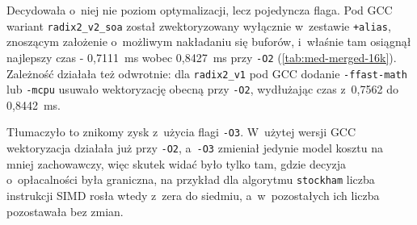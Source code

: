 Decydowała o~niej nie poziom optymalizacji, lecz pojedyncza flaga. Pod GCC wariant
\texttt{radix2\_v2\_soa} został zwektoryzowany wyłącznie w~zestawie
\texttt{+alias}, znoszącym założenie o~możliwym nakładaniu się buforów, i~właśnie
tam osiągnął najlepszy czas - 0,7111~ms wobec 0,8427~ms przy \texttt{-O2}
(\cref{tab:med-merged-16k}). Zależność działała też odwrotnie: dla
\texttt{radix2\_v1} pod GCC dodanie \texttt{-ffast-math} lub \texttt{-mcpu}
usuwało wektoryzację obecną przy \texttt{-O2}, wydłużając czas z~0,7562 do
0,8442~ms.

Tłumaczyło to znikomy zysk z~użycia flagi \texttt{-O3}. W~użytej wersji GCC
wektoryzacja działała już przy \texttt{-O2}, a~\texttt{-O3} zmieniał jedynie model
kosztu na mniej zachowawczy, więc skutek widać było tylko tam, gdzie decyzja
o~opłacalności była graniczna, na przykład dla algorytmu \texttt{stockham} liczba instrukcji SIMD
rosła wtedy z~zera do siedmiu, a~w~pozostałych ich liczba pozostawała bez zmian.
